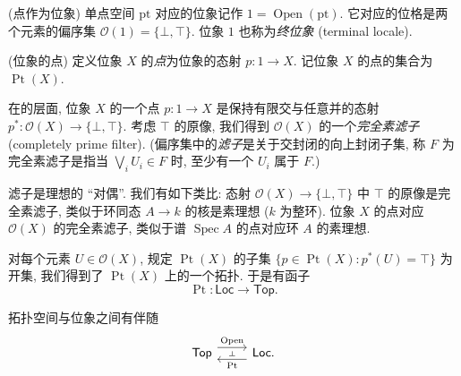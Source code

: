 \begin{example}
	{(点作为位象)}
	单点空间 $\text{pt}$ 对应的位象记作 $1 = \operatorname{Open}(\text{pt})$.
	它对应的位格是两个元素的偏序集 $\mathcal O(1) = \{\bot,\top\}$.
	位象 $1$ 也称为\emph{终位象} (terminal locale).
\end{example}


\begin{definition}
	[label={points-of-locale}]
	{(位象的点)}
	定义位象 $X$ 的\emph{点}为位象的态射 $p\colon 1 \to X$.
	记位象 $X$ 的点的集合为 $\operatorname{Pt}(X)$.
\end{definition}

在\fm{}的层面, 位象 $X$ 的一个点 $p\colon 1 \to X$ 是保持有限交与任意并的态射 $p^*\colon \mathcal O(X) \to \{\bot,\top\}$.
考虑 $\top$ 的原像, 我们得到 $\mathcal O(X)$ 的一个\emph{完全素滤子} (completely prime filter). (偏序集中的\emph{滤子}是关于交封闭的向上封闭子集, 称 $F$ 为完全素滤子是指当 $\bigvee_i U_i \in F$ 时, 至少有一个 $U_i$ 属于 $F$.)

\begin{remark}
	{}
	滤子是理想的 ``对偶''. 我们有如下类比: 态射 $\mathcal O(X)\to \{\bot,\top\}$ 中 $\top$ 的原像是完全素滤子, 类似于环同态 $A\to k$ 的核是素理想 ($k$ 为整环). 位象 $X$ 的点对应 $\mathcal O(X)$ 的完全素滤子, 类似于谱 $\operatorname{Spec}A$ 的点对应环 $A$ 的素理想.
\end{remark}

对每个元素 $U\in\mathcal O(X)$, 规定 $\operatorname{Pt}(X)$ 的子集
$\{p \in \operatorname{Pt}(X) \colon p^*(U) = \top\}$ 为开集,
我们得到了 $\operatorname{Pt}(X)$ 上的一个拓扑. 于是有函子
$$\operatorname{Pt} \colon \mathsf {Loc} \to \mathsf {Top}.$$

\begin{prop}
	[label={top-loc-adjunction}]
	{}
	拓扑空间与位象之间有伴随
	\[\begin{tikzcd}[ampersand replacement=\&]
		{\mathsf {Top}} \& {\mathsf {Loc}.}
		\arrow[""{name=0, anchor=center, inner sep=0}, "{\operatorname{Open}}", shift left=2, from=1-1, to=1-2]
		\arrow[""{name=1, anchor=center, inner sep=0}, "{\operatorname{Pt}}", shift left=2, from=1-2, to=1-1]
		\arrow["\dashv"{anchor=center, rotate=-90}, draw=none, from=0, to=1]
	\end{tikzcd}\]
\end{prop}

